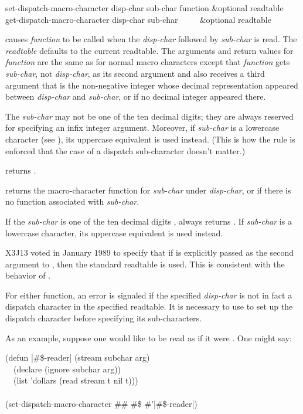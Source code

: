 \begin{defun}[Function]
set-dispatch-macro-character disp-char sub-char function &optional readtable \\
get-dispatch-macro-character disp-char sub-char ~~~~ &optional readtable

causes {\it function} to be called when the {\it disp-char}
followed by {\it sub-char} is read.  The {\it readtable} defaults to the
current readtable.  The arguments and return values for {\it function} are
the same as for normal macro characters
except that {\it function} gets {\it sub-char}, not {\it disp-char},
as its second argument and also receives a third
argument that is the non-negative integer whose decimal
representation appeared between
{\it disp-char} and {\it sub-char}, or {\false} if no decimal integer appeared
there.

The {\it sub-char} may not be one of the ten decimal digits;
they are always reserved for specifying an infix integer argument.
Moreover, if {\it sub-char} is a lowercase character
(see ), its uppercase equivalent is used instead.
(This is how the rule is enforced that the case of a dispatch sub-character
doesn't matter.)

 returns {\true}.

 returns the macro-character function
for {\it sub-char} under {\it disp-char}, or {\nil} if there is no
function associated with {\it sub-char}.

If the {\it sub-char} is one of the ten decimal digits ,
 always returns {\nil}.
If {\it sub-char} is a lowercase character,
its uppercase equivalent is used instead.

\begin{new}
X3J13 voted in January 1989
to specify that if  is explicitly passed as the
second argument to , then the standard readtable is used.
This is consistent with the behavior of .
\end{new}

For either function,
an error is signaled if the specified {\it disp-char} is not in fact
a dispatch character in the specified readtable.  It is necessary
to use  to set up the
dispatch character before specifying its sub-characters.

As an example, suppose one would like  to be read
as if it were .  One might say:
\begin{lisp}
(defun |\#\$-reader| (stream subchar arg) \\
~~(declare (ignore subchar arg)) \\
~~(list 'dollars (read stream t nil t))) \\
 \\
(set-dispatch-macro-character \#{\Xbackslash}\# \#{\Xbackslash}\$ \#'|\#\$-reader|)
\end{lisp}
\end{defun}

